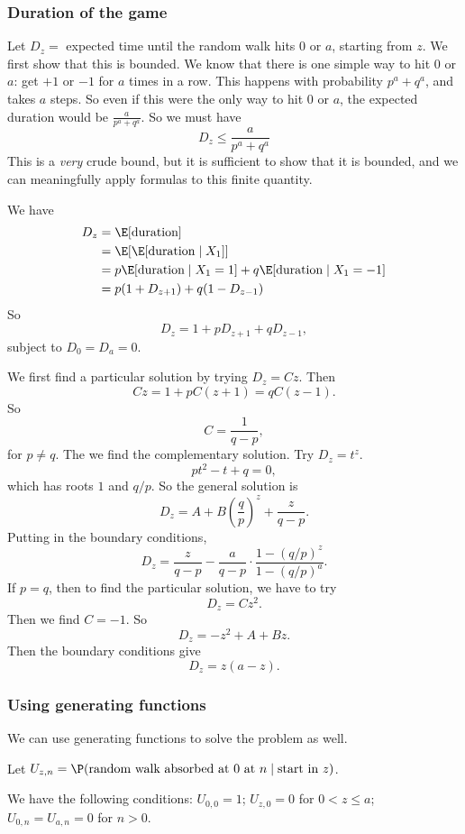 \documentclass[a4paper]{article}
\begin{document}
\subsubsection*{Duration of the game}
Let $D_z =$ expected time until the random walk hits $0$ or $a$, starting from $z$. We first show that this is bounded. We know that there is one simple way to hit $0$ or $a$: get $+1$ or $-1$ for $a$ times in a row. This happens with probability $p^a + q^a$, and takes $a$ steps. So even if this were the only way to hit $0$ or $a$, the expected duration would be $\frac{a}{p^a + q^a}$. So we must have
\[
  D_z \leq \frac{a}{p^a + q^a}
\]
This is a \emph{very} crude bound, but it is sufficient to show that it is bounded, and we can meaningfully apply formulas to this finite quantity.

We have
\begin{align*}
  D_z &= \E[\text{duration}]\\
  &= \E[\E[\text{duration}\mid X_1]]\\
  &= p\E[\text{duration}\mid X_1 = 1] + q\E[\text{duration}\mid X_1 = -1]\\
  &= p(1 + D_{z + 1}) + q(1 - D_{z - 1})
\end{align*}
So
\[
  D_z = 1 + pD_{z + 1} + qD_{z - 1},
\]
subject to $D_0 = D_a = 0$.

We first find a particular solution by trying $D_z = Cz$. Then
\[
  Cz = 1 + pC(z + 1) = qC(z - 1).
\]
So
\[
  C = \frac{1}{q - p},
\]
for $p \not = q$. The we find the complementary solution. Try $D_z = t^z$.
\[
  pt^2 - t + q = 0,
\]
which has roots $1$ and $q/p$. So the general solution is
\[
  D_z = A + B\left(\frac{q}{p}\right)^z + \frac{z}{q - p}.
\]
Putting in the boundary conditions,
\[
  D_z = \frac{z}{q - p} - \frac{a}{q - p} \cdot \frac{1 - (q/p)^z}{1 - (q/p)^a}.
\]
If $p = q$, then to find the particular solution, we have to try
\[
  D_z = Cz^2.
\]
Then we find $C = -1$. So
\[
  D_z = -z^2 + A + Bz.
\]
Then the boundary conditions give
\[
  D_z = z(a - z).
\]
\subsubsection*{Using generating functions}
We can use generating functions to solve the problem as well.

Let $U_{z,n} = \P(\text{random walk absorbed at 0 at }n\mid \text{start in }z)$.

We have the following conditions: $U_{0, 0} = 1$; $U_{z, 0} = 0$ for $0 < z \leq a$; $U_{0, n} = U_{a, n} = 0$ for $n > 0$.
\end{document}
